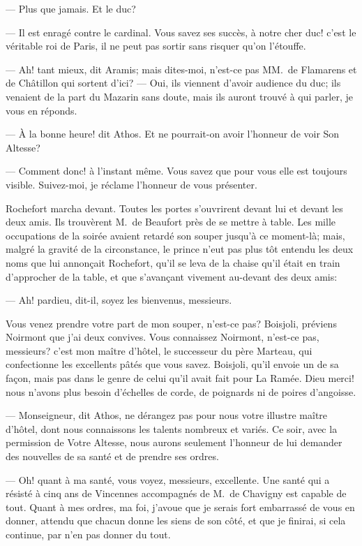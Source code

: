— Plus que jamais. Et le duc?

— Il est enragé contre le cardinal. Vous savez ses succès, à notre cher duc! c'est le véritable roi de Paris, il ne peut pas sortir sans risquer qu'on l'étouffe.

— Ah! tant mieux, dit Aramis; mais dites-moi, n'est-ce pas MM.~de Flamarens et de Châtillon qui sortent d'ici?
— Oui, ils viennent d'avoir audience du duc; ils venaient de la part du Mazarin sans doute, mais ils auront trouvé à qui parler, je vous en réponds.

— À la bonne heure! dit Athos. Et ne pourrait-on avoir l'honneur de voir Son Altesse?

— Comment donc! à l'instant même. Vous savez que pour vous elle est toujours visible. Suivez-moi, je réclame l'honneur de vous présenter.

Rochefort marcha devant. Toutes les portes s'ouvrirent devant lui et devant les deux amis. Ils trouvèrent M.~de Beaufort près de se mettre à table. Les mille occupations de la soirée avaient retardé son souper jusqu'à ce moment-là; mais, malgré la gravité de la circonstance, le prince n'eut pas plus tôt entendu les deux noms que lui annonçait Rochefort, qu'il se leva de la chaise qu'il était en train d'approcher de la table, et que s'avançant vivement au-devant des deux amis:

— Ah! pardieu, dit-il, soyez les bienvenus, messieurs.

Vous venez prendre votre part de mon souper, n'est-ce pas? Boisjoli, préviens Noirmont que j'ai deux convives. Vous connaissez Noirmont, n'est-ce pas, messieurs? c'est mon maître d'hôtel, le successeur du père Marteau, qui confectionne les excellents pâtés que vous savez. Boisjoli, qu'il envoie un de sa façon, mais pas dans le genre de celui qu'il avait fait pour La Ramée. Dieu merci! nous n'avons plus besoin d'échelles de corde, de poignards ni de poires d'angoisse.

— Monseigneur, dit Athos, ne dérangez pas pour nous votre illustre maître d'hôtel, dont nous connaissons les talents nombreux et variés. Ce soir, avec la permission de Votre Altesse, nous aurons seulement l'honneur de lui demander des nouvelles de sa santé et de prendre ses ordres.

— Oh! quant à ma santé, vous voyez, messieurs, excellente. Une santé qui a résisté à cinq ans de Vincennes accompagnés de M.~de Chavigny est capable de tout. Quant à mes ordres, ma foi, j'avoue que je serais fort embarrassé de vous en donner, attendu que chacun donne les siens de son côté, et que je finirai, si cela continue, par n'en pas donner du tout.

